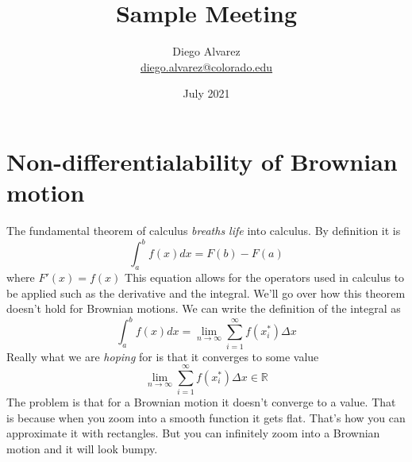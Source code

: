 \documentclass{article}
\title{Sample Meeting}
\author{Diego Alvarez \\ \href{mailto:diego.alvarez@colorado.edu}{diego.alvarez@colorado.edu}}
\date{July 2021}
\begin{document}
\maketitle

\section*{Non-differentialability of Brownian motion}
The fundamental theorem of calculus \emph{breaths life} into calculus. By definition it is
$$
\int_{a}^b f(x) dx = F(b) - F(a)
$$
where $F'(x) = f(x)$
\newline
\newline
This equation allows for the operators used in calculus to be applied such as the derivative and the integral.
\newline
\newline
We'll go over how this theorem doesn't hold for Brownian motions. We can write the definition of the integral as
$$
\int_a^b f(x)dx = \lim_{n \to \infty} \sum_{i=1}^\infty f(x_i^*) \Delta x
$$
Really what we are \emph{hoping} for is that it converges to some value
$$
\lim_{n \to \infty} \sum_{i=1}^\infty f(x_i^*) \Delta x \in \mathbb{R}
$$
The problem is that for a Brownian motion it doesn't converge to a value. That is because when you zoom into a smooth function it gets flat. That's how you can approximate it with rectangles. But you can infinitely zoom into a Brownian motion and it will look bumpy.
\end{document}

